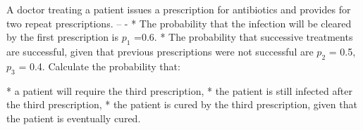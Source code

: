 
A doctor treating a patient issues a prescription for antibiotics and provides for two repeat prescriptions. 
--
- 
    * The probability that the infection will be cleared by the first prescription is $p_1$ =0.6.
* The probability that successive treatments are successful, given that previous prescriptions were not successful are $p_2$ = 0.5, $p_3$ = 0.4.
 Calculate the probability that:

\begin{enumerate}[(a)]
* a patient will require the third prescription,
* the patient is still infected after the third prescription,
* the patient is cured by the third prescription, given that the patient is eventually cured.
\end{enumerate}



 